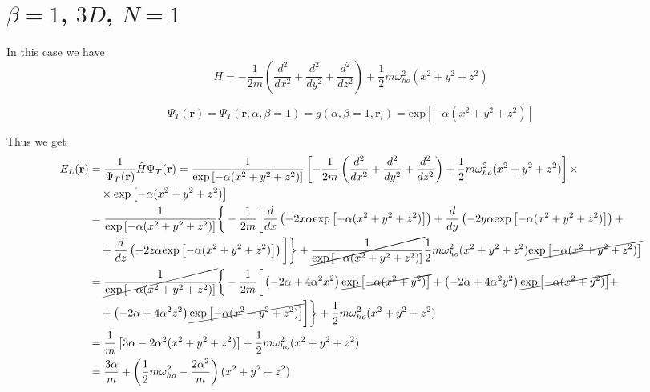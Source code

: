 \documentclass{article}
\begin{document}
\section{$\beta = 1$, $3D$, $N=1$}
In this case we have
\begin{equation*}
     H = -\frac{1}{2m} \left( \frac{d^2}{dx^2} + \frac{d^2}{dy^2} + \frac{d^2}{dz^2} \right) + \frac{1}{2} m \omega_{ho}^2 (x^2 + y^2 + z^2)
\end{equation*}

\begin{equation*}
    \Psi_T(\mathbf{r})=\Psi_T(\mathbf{r},\alpha,\beta=1)
    = g(\alpha,\beta=1,\mathbf{r}_i) = \text{exp}\left[-\alpha (x^2 + y^2 + z^2) \right]
\end{equation*}

Thus we get
\begin{align*}
    E_L(\mathbf{r}) &= \frac{1}{\Psi_T(\mathbf{r})} \hat{H} \Psi_T(\mathbf{r}) = \frac{1}{\text{exp}\left[-\alpha (x^2 + y^2 + z^2) \right]} \left[ -\frac{1}{2m} \left( \frac{d^2}{dx^2} + \frac{d^2}{dy^2} + \frac{d^2}{dz^2} \right) + \frac{1}{2} m \omega_{ho}^2 (x^2 + y^2 + z^2) \right] \times \\
    &\quad \times \text{exp}\left[-\alpha (x^2 + y^2 + z^2) \right] \\
    &= \frac{1}{\text{exp}\left[-\alpha (x^2 + y^2 + z^2) \right]} \bigg\{ -\frac{1}{2m} \bigg[ \frac{d}{dx} \left( -2x\alpha \text{exp}\left[-\alpha (x^2 + y^2 + z^2) \right] \right) + \frac{d}{dy} \left( -2y\alpha \text{exp}\left[-\alpha (x^2 + y^2 + z^2) \right] \right) + \\
    &\quad + \frac{d}{dz} \left( -2z\alpha \text{exp}\left[-\alpha (x^2 + y^2 + z^2) \right] \right) \bigg]\bigg\} + \cancel{\frac{1}{\text{exp}\left[-\alpha (x^2 + y^2 + z^2) \right]}} \frac{1}{2} m \omega_{ho}^2 (x^2 + y^2 + z^2) \cancel{\text{exp}\left[-\alpha (x^2 + y^2 + z^2) \right]}  \\
    &= \cancel{\frac{1}{\text{exp}\left[-\alpha (x^2 + y^2 + z^2) \right]}} \bigg\{ -\frac{1}{2m} \bigg[ \left( -2\alpha + 4\alpha^2x^2 \right) \cancel{\text{exp}\left[-\alpha (x^2 + y^2) \right]} + \left( -2\alpha + 4\alpha^2 y^2 \right) \cancel{\text{exp}\left[-\alpha (x^2 + y^2) \right]}  + \\
    &\quad + \left( -2\alpha + 4\alpha^2 z^2 \right) \cancel{\text{exp}\left[-\alpha (x^2 + y^2 + z^2) \right]}  \bigg] \bigg\} + \frac{1}{2} m \omega_{ho}^2 (x^2 + y^2 + z^2) \\
    &=  \frac{1}{m} \left[ 3\alpha - 2\alpha^2 (x^2 + y^2 + z^2) \right] + \frac{1}{2} m \omega_{ho}^2 (x^2 + y^2 + z^2) \\
    &= \frac{3\alpha}{m} + \left( \frac{1}{2} m \omega_{ho}^2 - \frac{2\alpha^2}{m} \right) (x^2 + y^2 + z^2)
\end{align*}
\end{document}
